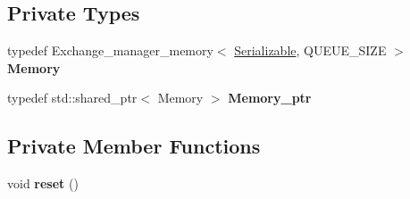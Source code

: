 \subsection*{Private Types}
\begin{DoxyCompactItemize}
\item 
\mbox{\label{classshared__memory_1_1Exchange__manager__consumer_a1699ba86d1d5b943d428fc1b391abd42}} 
typedef Exchange\+\_\+manager\+\_\+memory$<$ \hyperlink{classSerializable}{Serializable}, Q\+U\+E\+U\+E\+\_\+\+S\+I\+ZE $>$ {\bfseries Memory}
\item 
\mbox{\label{classshared__memory_1_1Exchange__manager__consumer_a92ad5c787b53c26d5b3c75712ca539f3}} 
typedef std\+::shared\+\_\+ptr$<$ Memory $>$ {\bfseries Memory\+\_\+ptr}
\end{DoxyCompactItemize}
\subsection*{Private Member Functions}
\begin{DoxyCompactItemize}
\item 
\mbox{\label{classshared__memory_1_1Exchange__manager__consumer_a7543d28030c9c3e17b8fd60facc917b2}} 
void {\bfseries reset} ()
\end{DoxyCompactItemize}

